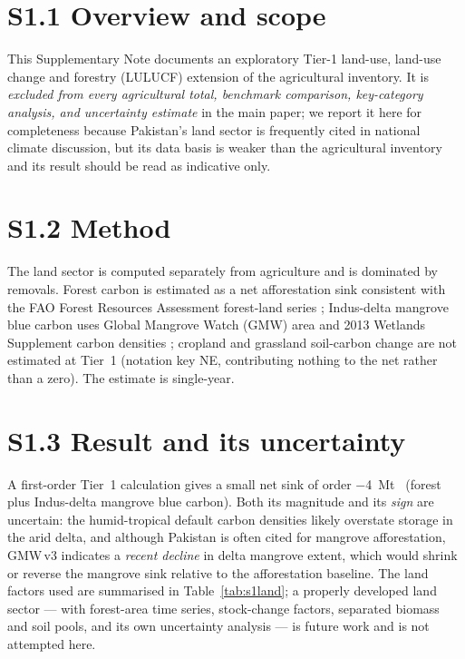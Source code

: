 
\section*{S1.1 Overview and scope}

This Supplementary Note documents an exploratory Tier-1 land-use, land-use change and forestry (LULUCF)
extension of the agricultural inventory. It is \emph{excluded from every agricultural total, benchmark
comparison, key-category analysis, and uncertainty estimate} in the main paper; we report it here for
completeness because Pakistan's land sector is frequently cited in national climate discussion, but its
data basis is weaker than the agricultural inventory and its result should be read as indicative only.

\section*{S1.2 Method}

The land sector is computed separately from agriculture and is dominated by removals. Forest carbon is
estimated as a net afforestation sink consistent with the FAO Forest Resources Assessment forest-land
series \citep{fra2020}; Indus-delta mangrove blue carbon uses Global Mangrove Watch (GMW) area
\citep{gmw} and 2013 Wetlands Supplement carbon densities \citep{ipcc2013wetlands}; cropland and
grassland soil-carbon change are not estimated at Tier~1 (notation key NE, contributing nothing
to the net rather than a zero). The estimate is single-year.

\section*{S1.3 Result and its uncertainty}

A first-order Tier~1 calculation gives a small net sink of order \SI{-4}{}~Mt~\COe{} (forest plus
Indus-delta mangrove blue carbon). Both its magnitude and its \emph{sign} are uncertain: the
humid-tropical default carbon densities likely overstate storage in the arid delta, and although Pakistan
is often cited for mangrove afforestation, GMW\,v3 indicates a \emph{recent decline} in delta mangrove
extent, which would shrink or reverse the mangrove sink relative to the afforestation baseline. The land
factors used are summarised in Table~\ref{tab:s1land}; a properly developed land sector --- with
forest-area time series, stock-change factors, separated biomass and soil pools, and its own uncertainty
analysis --- is future work and is not attempted here.

